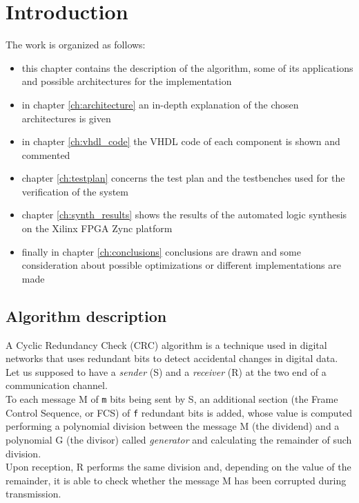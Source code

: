 %
\chapter{Introduction}\label{ch:introduction}
The work is organized as follows:
\begin{itemize}
	\item this chapter contains the description of the algorithm, some of its applications and possible architectures for the implementation
	\item in chapter \ref{ch:architecture} an in-depth explanation of the chosen architectures is given
	\item in chapter \ref{ch:vhdl_code} the VHDL code of each component is shown and commented
	\item chapter \ref{ch:testplan} concerns the test plan and the testbenches used for the verification of the system
	\item chapter \ref{ch:synth_results} shows the results of the automated logic synthesis on the Xilinx FPGA Zync platform
	\item finally in chapter \ref{ch:conclusions} conclusions are drawn and some consideration about possible optimizations or different implementations are made
\end{itemize}

\section{Algorithm description}\label{sec:alg_description}
A Cyclic Redundancy Check (CRC) algorithm is a technique used in digital networks that uses redundant bits to detect accidental changes in digital data.\\
Let us supposed to have a \textit{sender} (S) and a \textit{receiver} (R) at the two end of a communication channel.\\
To each message M of \texttt{m} bits being sent by S, an additional section (the Frame Control Sequence, or FCS) of \texttt{f} redundant bits is added, whose value is computed performing a polynomial division between the message M (the dividend) and a polynomial G (the divisor) called \textit{generator} and calculating the remainder of such division.\\
Upon reception, R performs the same division and, depending on the value of the remainder, it is able to check whether the message M has been corrupted during transmission.\\

